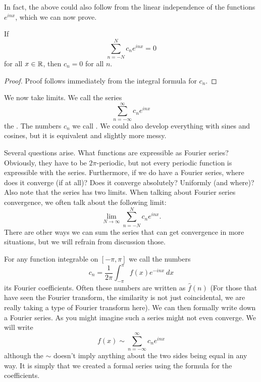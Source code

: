 In fact, the above could also follow from the linear independence of the
functions $e^{inx}$, which we can now prove.

\begin{prop}
If
\begin{equation*}
\sum_{n=-N}^N c_n e^{inx} = 0
\end{equation*}
for all $x \in {\mathbb{R}}$, then $c_n = 0$ for all $n$.
\end{prop}

\begin{proof}
Proof follows immediately from the integral formula for $c_n$.
\end{proof}

We now take limits.  We call the series
\begin{equation*}
\sum_{n=-\infty}^\infty c_n e^{inx}
\end{equation*}
the \emph{}.  The numbers $c_n$
we call \emph{}.  We could also develop everything with
sines and cosines, but it is equivalent and slightly more messy.

Several questions arise.  What functions are expressible as 
Fourier series?  Obviously, they have to be $2\pi$-periodic, but not every
periodic function is expressible with the series.  Furthermore, if we do have
a Fourier series, where does it converge (if at all)?  Does it converge
absolutely?  Uniformly (and where)?  Also note that the series has two
limits.  When talking about Fourier series convergence, we often
talk about the following limit:
\begin{equation*}
\lim_{N\to\infty} 
\sum_{n=-N}^N c_n e^{inx} .
\end{equation*}
There are other ways we can sum the series that can get convergence in more
situations, but we will refrain from discussion those.

For any function integrable on $[-\pi,\pi]$ we call the numbers
\begin{equation*}
c_n = 
\frac{1}{2\pi} \int_{-\pi}^\pi
f(x) e^{-inx} ~ dx
\end{equation*}
its Fourier coefficients.  Often these numbers are
written as $\hat{f}(n)$ (For those that have seen the Fourier transform,
the similarity is not just
coincidental, we are really taking a type of Fourier transform here).
We can then formally write down a Fourier series.
As you might imagine such a series might not even converge.
We will write
\begin{equation*}
f(x) \sim
\sum_{n=-\infty}^\infty c_n e^{inx}
\end{equation*}
although the $\sim$ doesn't imply anything about the two sides being equal
in any way.  It is simply that we created a formal series using the formula
for the coefficients.

